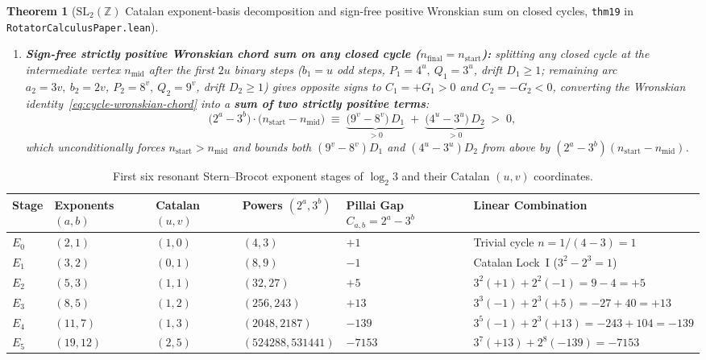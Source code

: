 \documentclass[11pt,a4paper]{article}
\newtheorem{theorem}{Theorem}[section]
\theoremstyle{definition}
\theoremstyle{remark}
\begin{document}
\begin{theorem}[$\mathrm{SL}_2(\mathbb{Z})$ Catalan exponent-basis decomposition and sign-free positive Wronskian sum on closed cycles, \texttt{thm19} in \texttt{RotatorCalculusPaper.lean}]
\begin{enumerate}[label=\textbf{(\roman*)},leftmargin=*]
  \begin{equation}
    \label{eq:gap-split-g1-g2}
    C_{\mathrm{tot}} \;\equiv\; 8^v\,\bigl(4^u - 3^u\bigr) \;-\; 3^u\,\bigl(9^v - 8^v\bigr) \;\equiv\; 9^v\,\bigl(4^u - 3^u\bigr) \;-\; 4^u\,\bigl(9^v - 8^v\bigr);
  \end{equation}
\item \textbf{Sign-free strictly positive Wronskian chord sum on any closed cycle ($n_{\mathrm{final}} = n_{\mathrm{start}}$):}
  splitting any closed cycle at the intermediate vertex $n_{\mathrm{mid}}$ after the first $2u$ binary steps ($b_1 = u$ odd steps, $P_1 = 4^u,\ Q_1 = 3^u$, drift $D_1 \ge 1$; remaining arc $a_2 = 3v,\ b_2 = 2v$, $P_2 = 8^v,\ Q_2 = 9^v$, drift $D_2 \ge 1$) gives opposite signs to $C_1 = +G_1 > 0$ and $C_2 = -G_2 < 0$, converting the Wronskian identity~\eqref{eq:cycle-wronskian-chord} into a \textbf{sum of two strictly positive terms}:
  \begin{equation}
    \label{eq:positive-wronskian-sum}
    \bigl(2^a - 3^b\bigr)\cdot\bigl(n_{\mathrm{start}} - n_{\mathrm{mid}}\bigr) \;\equiv\; \underbrace{\bigl(9^v - 8^v\bigr)\,D_1}_{> 0} \;+\; \underbrace{\bigl(4^u - 3^u\bigr)\,D_2}_{> 0} \;>\; 0,
  \end{equation}
  which unconditionally forces $n_{\mathrm{start}} > n_{\mathrm{mid}}$ and bounds both $(9^v - 8^v)D_1$ and $(4^u - 3^u)D_2$ from above by $(2^a - 3^b)(n_{\mathrm{start}} - n_{\mathrm{mid}})$.
\end{enumerate}
\end{theorem}

\begin{table}[htbp]
\centering
\caption{First six resonant Stern--Brocot exponent stages of $\log_2 3$ and their Catalan $(u,v)$ coordinates.}
\label{tab:collatz-stages}
\small
\begin{tabular}{@{}llllll@{}}
\toprule
\textbf{Stage} & \textbf{Exponents $(a,b)$} & \textbf{Catalan $(u,v)$} & \textbf{Powers $(2^a, 3^b)$} & \textbf{Pillai Gap $C_{a,b} = 2^a - 3^b$} & \textbf{Linear Combination} \\
\midrule
$E_0$ & $(2, 1)$ & $(1, 0)$ & $(4, 3)$ & $+1$ & Trivial cycle $n = 1/(4-3) = 1$ \\
$E_1$ & $(3, 2)$ & $(0, 1)$ & $(8, 9)$ & $-1$ & Catalan Lock~I ($3^2 - 2^3 = 1$) \\
$E_2$ & $(5, 3)$ & $(1, 1)$ & $(32, 27)$ & $+5$ & $3^2(+1) + 2^2(-1) = 9 - 4 = +5$ \\
$E_3$ & $(8, 5)$ & $(1, 2)$ & $(256, 243)$ & $+13$ & $3^3(-1) + 2^3(+5) = -27 + 40 = +13$ \\
$E_4$ & $(11, 7)$ & $(1, 3)$ & $(2048, 2187)$ & $-139$ & $3^5(-1) + 2^3(+13) = -243 + 104 = -139$ \\
$E_5$ & $(19, 12)$ & $(2, 5)$ & $(524288, 531441)$ & $-7153$ & $3^7(+13) + 2^8(-139) = -7153$ \\
\bottomrule
\end{tabular}
\end{table}
\end{document}
